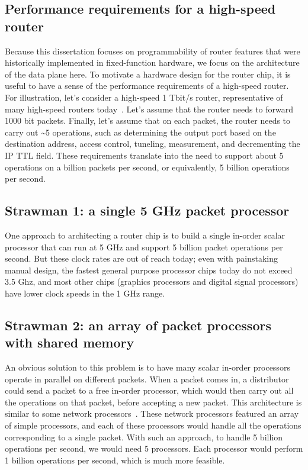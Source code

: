 \subsection{Performance requirements for a high-speed router}
Because this dissertation focuses on programmability of router features that
were historically implemented in fixed-function hardware, we focus on the
architecture of the data plane here. To motivate a hardware design for the
router chip, it is useful to have a sense of the performance requirements of a
high-speed router. For illustration, let's consider a high-speed 1 Tbit/s
router, representative of many high-speed routers today~\cite{trident2,
tomahawk, tomahawk2}. Let's assume that the router needs to forward 1000 bit
packets. Finally, let's assume that on each packet, the router needs to carry
out \textasciitilde5 operations, such as determining the output port based on
the destination address, access control, tuneling, measurement, and
decrementing the IP TTL field. These requirements translate into the need to
support about 5 operations on a billion packets per second, or equivalently, 5
billion operations per second.

\subsection{Strawman 1: a single 5 GHz packet processor}
One approach to architecting a router chip is to build a single in-order scalar
processor that can run at 5 GHz and support 5 billion packet operations per
second. But these clock rates are out of reach today; even with painstaking
manual design, the fastest general purpose processor chips today do not exceed
3.5 Ghz, and most other chips (\eg graphics processors and digital signal
processors) have lower clock speeds in the 1 GHz range.

\subsection{Strawman 2: an array of packet processors with shared memory}

An obvious solution to this problem is to have many scalar in-order processors
operate in parallel on different packets. When a packet comes in, a distributor
could send a packet to a free in-order processor, which would then carry out
all the operations on that packet, before accepting a new packet. This
architecture is similar to some network processors~\cite{ixp1200, ixp2400,
quantumflow}.  These network processors featured an array of simple processors,
and each of these processors would handle all the operations corresponding to a
single packet.  With such an approach, to handle 5 billion operations per
second, we would need 5 processors. Each processor would perform 1 billion
operations per second, which is much more feasible.

